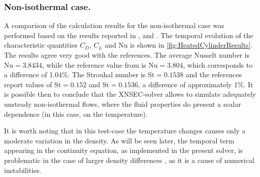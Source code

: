 \subsubsection{Non-isothermal case.}
A comparison of the calculation results for the non-isothermal case was performed based on the results reported in \cite{shiHeatingEffectSteady2004}, \cite{wangRelationshipEffectiveReynolds2000} and \cite{henninkLowMachNumberFlow2022}.
The temporal evolution of the characteristic quantities $C_D$, $C_L$ and Nu is shown in \cref{fig:HeatedCylinderResults}. The results agree very good with the references. The average Nusselt number is  $\text{Nu} = 3.8434$, while the reference value from \cite{henninkLowMachNumberFlow2022} is $\text{Nu} = 3.804$, which corresponds to a difference of 1.04\%. The Strouhal number is $\text{St} = 0.1538$ and the references report values of $\text{St} = 0.152$ and $\text{St} = 0.1536$, a difference of approximately 1\%. It is possible then to conclude that the XNSEC-solver allows to simulate adequately unsteady non-isothermal flows, where the fluid properties do present a scalar dependence (in this case, on the temperature). 

It is worth noting that in this test-case the temperature changes causes only a moderate variation in the density. As will be seen later, the temporal term appearing in the continuity equation, as implemented in the present solver, is problematic in the case of larger density differences \citep{knikkerComparativeStudyHighorder2011}, as it is a cause of numerical instabilities.




\FloatBarrier